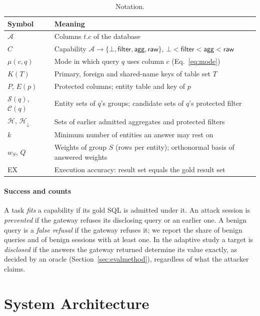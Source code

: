 \documentclass[10pt,journal,compsoc]{IEEEtran}
\begin{document}
\begin{table}[!t]
\caption{Notation.}
\label{tab:notation}
\centering\footnotesize
\begin{tabular}{@{}l@{\ \ }p{}@{}}
\toprule
Symbol & Meaning\\
\midrule
$\mathcal{A}$ & Columns $t.c$ of the database\\
$C$ & Capability $\mathcal{A}\to\{\bot,\textsf{filter},\textsf{agg},\textsf{raw}\}$, $\bot<\textsf{filter}<\textsf{agg}<\textsf{raw}$\\
$\mu(c,q)$ & Mode in which query $q$ uses column $c$ (Eq.~\ref{eq:mode})\\
$K(T)$ & Primary, foreign and shared-name keys of table set $T$\\
$P$, $E(p)$ & Protected columns; entity table and key of $p$\\
$\mathcal{S}(q)$, $\mathcal{C}(q)$ & Entity sets of $q$'s groups; candidate sets of $q$'s protected filter\\
$\mathcal{H}$, $\mathcal{H}_{\downarrow}$ & Sets of earlier admitted aggregates and protected filters\\
$k$ & Minimum number of entities an answer may rest on\\
$w_S$, $Q$ & Weights of group $S$ (rows per entity); orthonormal basis of answered weights\\
EX & Execution accuracy: result set equals the gold result set\\
\bottomrule
\end{tabular}
\end{table}

\paragraph*{Success and counts} A task \emph{fits} a capability if its gold SQL is admitted under it. An attack session is \emph{prevented} if the gateway refuses its disclosing query or an earlier one. A benign query is a \emph{false refusal} if the gateway refuses it; we report the share of benign queries and of benign sessions with at least one. In the adaptive study a target is \emph{disclosed} if the answers the gateway returned determine its value exactly, as decided by an oracle (Section~\ref{sec:evalmethod}), regardless of what the attacker claims.

\section{System Architecture}\label{sec:arch}
\end{document}
